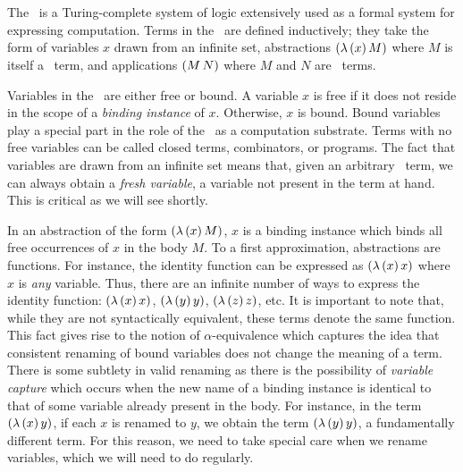 \chapter{\lc}

The \lc\ is a Turing-complete system of logic extensively used as a formal system for
expressing computation. Terms in the \lc\ are defined inductively; they take the form of
variables $x$ drawn from an infinite set, abstractions $(\lambda\,(x)\,M)$ where $M$ is itself a
\lc\ term, and applications $(M\,N)$ where $M$ and $N$ are \lc\ terms.

Variables in the \lc\ are either free or bound. A variable $x$ is free if it does not
reside in the scope of a \emph{binding instance} of $x$. Otherwise, $x$ is bound. Bound
variables play a special part in the role of the \lc\ as a computation substrate. Terms
with no free variables can be called closed terms, combinators, or programs. The fact that
variables are drawn from an infinite set means that, given an arbitrary \lc\ term, we can
always obtain a \emph{fresh variable}, a variable not present in the term at hand. This is
critical as we will see shortly.

In an abstraction of the form $(\lambda\,(x)\,M)$, $x$ is a binding instance which binds all free
occurrences of $x$ in the body $M$. To a first approximation, abstractions are functions.
For instance, the identity function can be expressed as $(\lambda\,(x)\,x)$ where $x$ is
\emph{any} variable. Thus, there are an infinite number of ways to express the identity
function: $(\lambda\,(x)\,x)$, $(\lambda\,(y)\,y)$, $(\lambda\,(z)\,z)$, etc. It is important to note that,
while they are not syntactically equivalent, these terms denote the same function. This
fact gives rise to the notion of $\alpha$-equivalence which captures the idea that
consistent renaming of bound variables does not change the meaning of a term. There is
some subtlety in valid renaming as there is the possibility of \emph{variable capture}
which occurs when the new name of a binding instance is identical to that of some variable
already present in the body. For instance, in the term $(\lambda\,(x)\,y)$, if each $x$ is
renamed to $y$, we obtain the term $(\lambda\,(y)\,y)$, a fundamentally different term. For this
reason, we need to take special care when we rename variables, which we will need to do
regularly.

